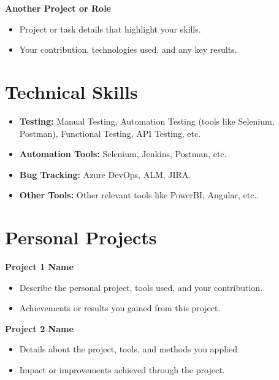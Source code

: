 \documentclass[a4paper,10pt]{article}
\begin{document}
\vspace{3mm}
\textbf{{Another Project or Role}} \\
\begin{itemize}[left=0pt, label=$\bullet$, topsep=3pt]
    \item {Project or task details that highlight your skills}.
    \item {Your contribution, technologies used, and any key results}.
\end{itemize}

\section*{Technical Skills}
\begin{itemize}[left=0pt, label=$\bullet$, topsep=3pt]
    \item \textbf{Testing:} {Manual Testing, Automation Testing (tools like Selenium, Postman)}, Functional Testing, API Testing, etc.
    \item \textbf{Automation Tools:} {Selenium, Jenkins, Postman, etc.}
    \item \textbf{Bug Tracking:} {Azure DevOps, ALM, JIRA}.
    \item \textbf{Other Tools:} {Other relevant tools like PowerBI, Angular, etc.}.
\end{itemize}

\section*{Personal Projects}
\textbf{{Project 1 Name}} \\
\begin{itemize}[left=0pt, label=$\circ$, topsep=3pt]
    \item {Describe the personal project, tools used, and your contribution}.
    \item {Achievements or results you gained from this project}.
\end{itemize}

\textbf{{Project 2 Name}} \\
\begin{itemize}[left=0pt, label=$\circ$, topsep=3pt]
    \item {Details about the project, tools, and methods you applied}.
    \item {Impact or improvements achieved through the project}.
\end{itemize}

\end{document}
